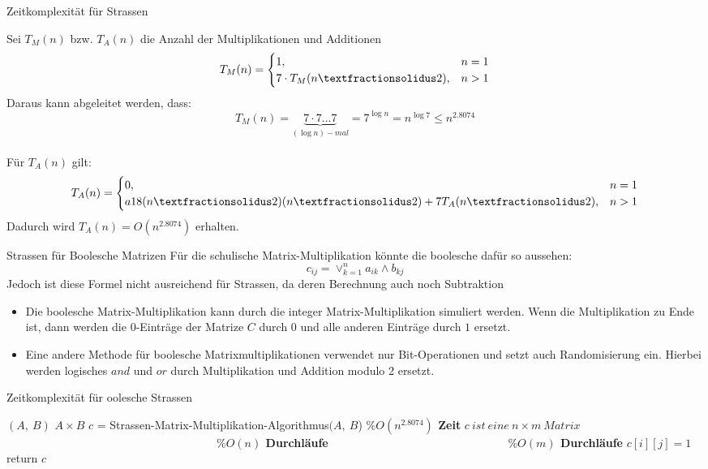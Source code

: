 \documentclass{beamer}
\begin{document}
	
	\begin{frame}{Zeitkomplexität für Strassen}
		
		Sei $T_M(n)$ bzw. $T_A(n)$ die Anzahl der Multiplikationen und Additionen
		$$
		T_M(n) = 
		\begin{cases}
			1, & n=1\\
			7 \cdot T_M(n \textfractionsolidus 2), & n>1 
		\end{cases}
		$$
		Daraus kann abgeleitet werden, dass:
		$$T_M(n) = \underbrace{7 \cdot 7 \ldots 7}_{(\log n)-mal} = 7^{\log n} = n^{\log 7} \le n^{2.8074}$$
		\\
		Für $T_A(n)$ gilt:
		$$
		T_A(n) = 
		\begin{cases}
			0, & n=1\\a
			18(n\textfractionsolidus 2) (n\textfractionsolidus 2) + 7T_A(n\textfractionsolidus 2), & n>1 
		\end{cases}
		$$
		Dadurch wird $T_A(n) = O(n^{2.8074})$ erhalten.
	\end{frame}	


	\begin{frame}{Strassen für Boolesche Matrizen}
		Für die schulische Matrix-Multiplikation könnte die boolesche dafür so aussehen:
		\pause
		$$c_{ij} = \lor_{k=1}^n a_{ik}\land b_{kj} $$
		\pause
		Jedoch ist diese Formel nicht ausreichend für Strassen, da deren Berechnung auch noch Subtraktion
		\begin{itemize}
			\item Die boolesche Matrix-Multiplikation kann durch die integer Matrix-Multiplikation simuliert werden. Wenn die Multiplikation zu Ende ist, dann werden die $0$-Einträge der Matrize $C$ durch $0$ und alle anderen Einträge durch $1$ ersetzt.
			\item Eine andere Methode für boolesche Matrixmultiplikationen verwendet nur Bit-Operationen und setzt auch Randomisierung ein. Hierbei werden logisches $and$ und $or$ durch Multiplikation und Addition modulo 2 ersetzt.
		\end{itemize}
		
	\end{frame}

	\begin{frame}{Zeitkomplexität für oolesche Strassen}
		\begin{algorithm}[H]
			\caption[Boolean-Strassen]{Boolean-Strassen}
			\label{algorithm20}
			\begin{algorithmic}[1]
				\Require $(A, \ B)$
				\Ensure $A \times B$
				\State $c$ = Strassen-Matrix-Multiplikation-Algorithmus$(A ,\ B$) \textbf{$ \%O(n^{2.8074})$ Zeit}
				\State $c \ ist \ eine \ n \times m \ Matrix$
				 \ \ \ \ \ \ \ \ \ \ \ \ \ \ \ \ \ \ \ \ \ \ \ \ \ \ \ \ \ \ \ \ \ \ \ \ \ \textbf{$ \%O(n)$ Durchläufe}
				 \ \ \ \ \ \ \ \ \ \ \ \ \ \ \ \ \ \ \ \ \ \ \ \ \ \ \ \ \ \ \ \textbf{$ \%O(m)$ Durchläufe}
				\State $c[i][j] = 1$
				\EndIf
				\EndFor
				\EndFor
				\State return $c$
			\end{algorithmic}
		\end{algorithm}
	\end{frame}
\end{document}
